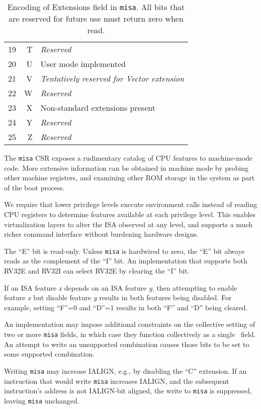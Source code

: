 \begin{table*}
\begin{center}
\begin{tabular}{|r|r|l|}
 19 & T & {\em Reserved} \\
 20 & U & User mode implemented \\
 21 & V & {\em Tentatively reserved for Vector extension} \\
 22 & W & {\em Reserved} \\
 23 & X & Non-standard extensions present \\
 24 & Y & {\em Reserved} \\
 25 & Z & {\em Reserved} \\
\hline
\end{tabular}
\end{center}
\caption{Encoding of Extensions field in {\tt misa}.  All bits that are
  reserved for future use must return zero when read.}
\label{misaletters}
\end{table*}


\begin{commentary}
The {\tt misa} CSR exposes a rudimentary catalog of CPU features
to machine-mode code.  More extensive information can be obtained in
machine mode by probing other machine registers, and examining other
ROM storage in the system as part of the boot process.

We require that lower privilege levels execute environment calls
instead of reading CPU registers to determine features available at
each privilege level. This enables virtualization layers to alter the
ISA observed at any level, and supports a much richer command
interface without burdening hardware designs.
\end{commentary}

The ``E'' bit is read-only.  Unless {\tt misa} is hardwired to zero, the ``E''
bit always reads as the complement of the ``I'' bit.  An implementation that
supports both RV32E and RV32I can select RV32E by clearing the ``I'' bit.

If an ISA feature {\em x} depends on an ISA feature {\em y}, then attempting
to enable feature {\em x} but disable feature {\em y} results in both features
being disabled.  For example, setting ``F''=0 and ``D''=1 results in both
``F'' and ``D'' being cleared.

An implementation may impose additional constraints on the collective setting
of two or more {\tt misa} fields, in which case they function collectively as
a single \warl\ field.  An attempt to write an unsupported combination causes
those bits to be set to some supported combination.

Writing {\tt misa} may increase IALIGN, e.g., by disabling the ``C''
extension.
If an instruction that would write {\tt misa} increases IALIGN, and
the subsequent instruction's address is not IALIGN-bit aligned, the
write to {\tt misa} is suppressed, leaving {\tt misa} unchanged.

